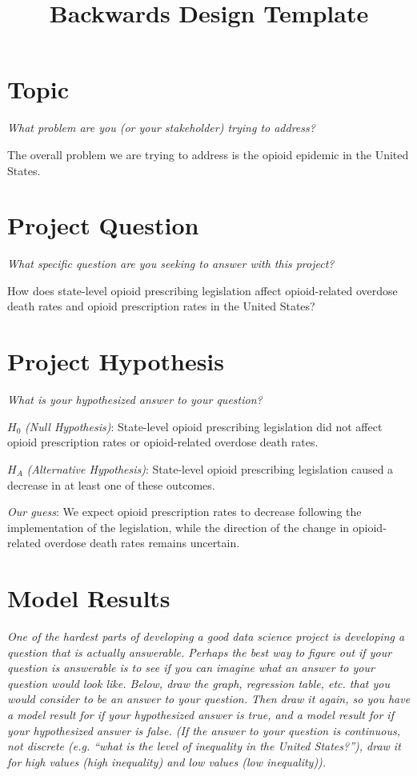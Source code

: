 \documentclass[12pt]{article}
\title{Backwards Design Template}
\begin{document}
\maketitle

\section{Topic}
\emph{What problem are you (or your stakeholder) trying to address?}

The overall problem we are trying to address is the opioid epidemic in the 
United States.
\vspace*{2cm}\\


\section{Project Question}
\emph{What specific question are you seeking to answer with this project?}

How does state-level opioid prescribing legislation affect opioid-related 
overdose death rates and opioid prescription rates in the United States?
\vspace*{2cm}\\


\section{Project Hypothesis}
\emph{What is your hypothesized answer to your question?}

$H_0$ \emph{(Null Hypothesis)}: State-level opioid prescribing legislation did 
not affect opioid prescription rates or opioid-related overdose death rates.

$H_A$ \emph{(Alternative Hypothesis)}: State-level opioid prescribing 
legislation caused a decrease in at least one of these outcomes. 

\emph{Our guess}: We expect opioid prescription rates to decrease following the 
implementation of the legislation, while the direction of the change in opioid-
related overdose death rates remains uncertain.
\vspace*{2cm}\\

\section{Model Results}
\emph{One of the hardest parts of developing a good data science project is 
developing a question that is actually answerable. Perhaps the best way to 
figure out if your question is answerable is to see if you can imagine what an 
answer to your question would look like. Below, draw the graph, regression 
table, etc. that you would consider to be an answer to your question. Then draw 
it again, so you have a model result for if your hypothesized answer is true, 
and a model result for if your hypothesized answer is false. (If the answer to 
your question is continuous, not discrete (e.g. ``what is the level of 
inequality in the United States?''), draw it for high values (high inequality) 
and low values (low inequality)).}
\end{document}
